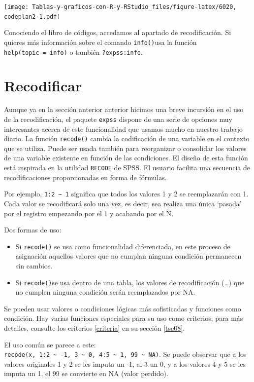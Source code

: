 \documentclass[
]{book}
\providecommand{\tightlist}{%
  \setlength{\itemsep}{0pt}\setlength{\parskip}{0pt}}
\begin{document}
\texttt{[image: Tablas-y-graficos-con-R-y-RStudio\_files/figure-latex/6020, codeplan2-1.pdf]}

Conociendo el libro de códigos, accedamos al apartado de recodificación. Si quieres más información sobre el comando \texttt{info()}usa la función \texttt{help(topic\ =\ info)} o también \texttt{?expss:info}.

\hypertarget{recode}{%
\section{Recodificar}\label{recode}}

Aunque ya en la sección anterior anterior hicimos una breve incursión en el uso de la recodificación, el paquete \texttt{expss} dispone de una serie de opciones muy interesantes acerca de este funcionalidad que usamos mucho en nuestro trabajo diario. La función \texttt{recode()} cambia la codificación de una variable en el contexto que se utiliza. Puede ser usada también para reorganizar o consolidar los valores de una variable existente en función de las condiciones. El diseño de esta función está inspirada en la utilidad \texttt{RECODE} de SPSS. El usuario facilita una secuencia de recodificaciones proporcionadas en forma de fórmulas.

Por ejemplo, \texttt{1:2\ \textasciitilde{}\ 1} significa que todos los valores 1 y 2 se reemplazarán con 1. Cada valor se recodificará solo una vez, es decir, sea realiza una única `pasada' por el registro empezando por el 1 y acabando por el N.

Dos formas de uso:

\begin{itemize}
\tightlist
\item
  Si \texttt{recode()} se usa como funcionalidad diferenciada, en este proceso de asignación aquellos valores que no cumplan ninguna condición permanecen sin cambios.
\item
  Si \texttt{recode()}se usa dentro de una tabla, los valores de recodificación (\ldots) que no cumplen ninguna condición serán reemplazados por NA.
\end{itemize}

Se pueden usar valores o condiciones lógicas más sofisticadas y funciones como condición. Hay varias funciones especiales para su uso como criterios; para más detalles, consulte los criterios \ref{criteria} en su sección \ref{tse08}.

El uso común se parece a este: \texttt{recode(x,\ 1:2\ \textasciitilde{}\ -1,\ 3\ \textasciitilde{}\ 0,\ 4:5\ \textasciitilde{}\ 1,\ 99\ \textasciitilde{}\ NA)}. Se puede observar que a los valores originales 1 y 2 se les imputa un -1, al 3 un 0, y a los valores 4 y 5 se les imputa un 1, el 99 se convierte en NA (valor perdido).
\end{document}
